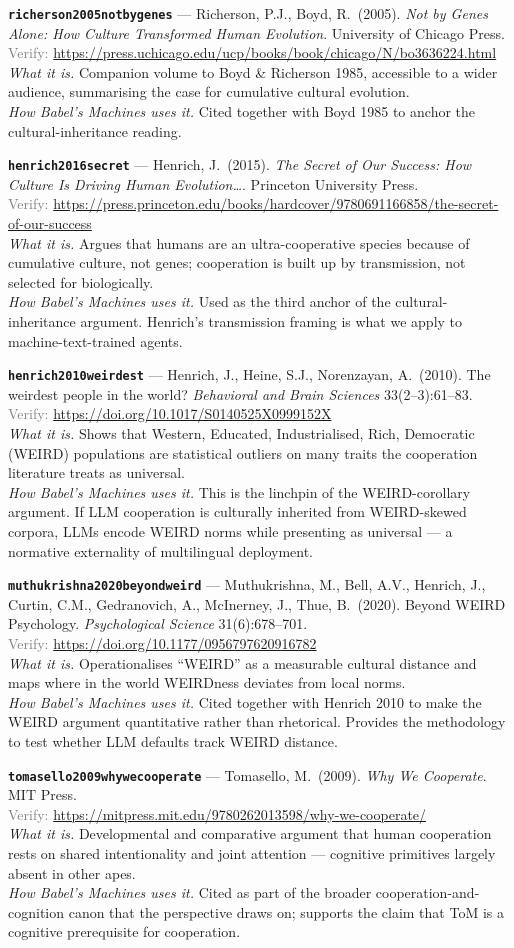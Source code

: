 \documentclass[11pt,a4paper]{article}
\newcommand{\entry}[5]{%
  \par\smallskip
  \noindent\textbf{\texttt{#1}} --- #2\\
  {\footnotesize \textcolor{gray}{Verify:} \url{#3}}\\
  \textit{What it is.} #4\\
  \textit{How Babel's Machines uses it.} #5
  \par\medskip
}
\begin{document}
\entry{richerson2005notbygenes}
{Richerson, P.J., Boyd, R.\ (2005). \emph{Not by Genes Alone: How Culture Transformed Human Evolution}. University of Chicago Press.}
{https://press.uchicago.edu/ucp/books/book/chicago/N/bo3636224.html}
{Companion volume to Boyd \& Richerson 1985, accessible to a wider audience, summarising the case for cumulative cultural evolution.}
{Cited together with Boyd 1985 to anchor the cultural-inheritance reading.}

\entry{henrich2016secret}
{Henrich, J.\ (2015). \emph{The Secret of Our Success: How Culture Is Driving Human Evolution\dots}. Princeton University Press.}
{https://press.princeton.edu/books/hardcover/9780691166858/the-secret-of-our-success}
{Argues that humans are an ultra-cooperative species because of cumulative culture, not genes; cooperation is built up by transmission, not selected for biologically.}
{Used as the third anchor of the cultural-inheritance argument. Henrich's transmission framing is what we apply to machine-text-trained agents.}

\entry{henrich2010weirdest}
{Henrich, J., Heine, S.J., Norenzayan, A.\ (2010). The weirdest people in the world? \emph{Behavioral and Brain Sciences} 33(2--3):61--83.}
{https://doi.org/10.1017/S0140525X0999152X}
{Shows that Western, Educated, Industrialised, Rich, Democratic (WEIRD) populations are statistical outliers on many traits the cooperation literature treats as universal.}
{This is the linchpin of the WEIRD-corollary argument. If LLM cooperation is culturally inherited from WEIRD-skewed corpora, LLMs encode WEIRD norms while presenting as universal --- a normative externality of multilingual deployment.}

\entry{muthukrishna2020beyondweird}
{Muthukrishna, M., Bell, A.V., Henrich, J., Curtin, C.M., Gedranovich, A., McInerney, J., Thue, B.\ (2020). Beyond WEIRD Psychology. \emph{Psychological Science} 31(6):678--701.}
{https://doi.org/10.1177/0956797620916782}
{Operationalises ``WEIRD'' as a measurable cultural distance and maps where in the world WEIRDness deviates from local norms.}
{Cited together with Henrich 2010 to make the WEIRD argument quantitative rather than rhetorical. Provides the methodology to test whether LLM defaults track WEIRD distance.}

\entry{tomasello2009whywecooperate}
{Tomasello, M.\ (2009). \emph{Why We Cooperate}. MIT Press.}
{https://mitpress.mit.edu/9780262013598/why-we-cooperate/}
{Developmental and comparative argument that human cooperation rests on shared intentionality and joint attention --- cognitive primitives largely absent in other apes.}
{Cited as part of the broader cooperation-and-cognition canon that the perspective draws on; supports the claim that ToM is a cognitive prerequisite for cooperation.}
\end{document}
